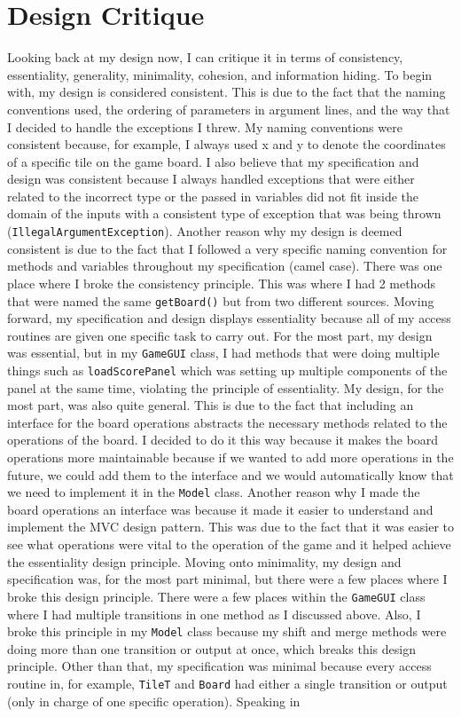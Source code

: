\documentclass[12pt]{article}
\begin{document}
\newpage

\section{Design Critique}
\hspace{\parindent}Looking back at my design now, I can critique it in terms of consistency, essentiality, generality, minimality, cohesion, and information hiding. To begin with, my design is considered consistent. This is due to the fact that the naming conventions used, the ordering of parameters in argument lines, and the way that I decided to handle the exceptions I threw. My naming conventions were consistent because, for example, I always used x and y to denote the coordinates of a specific tile on the game board. I also believe that my specification and design was consistent because I always handled exceptions that were either related to the incorrect type or the passed in variables did not fit inside the domain of the inputs with a consistent type of exception that was being thrown (\verb|IllegalArgumentException|). Another reason why my design is deemed consistent is due to the fact that I followed a very specific naming convention for methods and variables throughout my specification (camel case). There was one place where I broke the consistency principle. This was where I had 2 methods that were named the same \verb|getBoard()| but from two different sources. Moving forward, my specification and design displays essentiality because all of my access routines are given one specific task to carry out. For the most part, my design was essential, but in my \verb|GameGUI| class, I had methods that were doing multiple things such as \verb|loadScorePanel| which was setting up multiple components of the panel at the same time, violating the principle of essentiality. My design, for the most part, was also quite general. This is due to the fact that including an interface for the board operations abstracts the necessary methods related to the operations of the board. I decided to do it this way because it makes the board operations more maintainable because if we wanted to add more operations in the future, we could add them to the interface and we would automatically know that we need to implement it in the  \verb|Model| class. Another reason why I made the board operations an interface was because it made it easier to understand and implement the MVC design pattern. This was due to the fact that it was easier to see what operations were vital to the operation of the game and it helped achieve the essentiality design principle. Moving onto minimality, my design and specification was, for the most part minimal, but there were a few places where I broke this design principle. There were a few places within the \verb|GameGUI| class where I had multiple transitions in one method as I discussed above. Also, I broke this principle in my \verb|Model| class because my shift and merge methods were doing more than one transition or output at once, which breaks this design principle. Other than that, my specification was minimal because every access routine in, for example, \verb|TileT| and \verb|Board| had either a single transition or output (only in charge of one specific operation). Speaking in 
\end{document}
